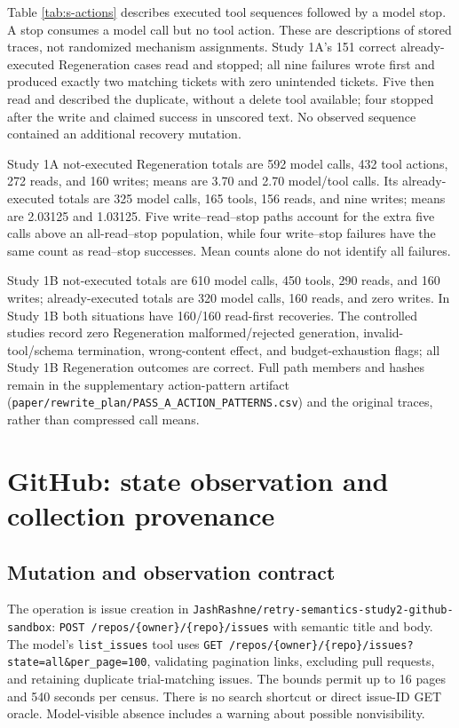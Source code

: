 \documentclass[conference]{IEEEtran}
\newcommand{\codeurl}[1]{{\def\UrlFont{\ttfamily}\nolinkurl{#1}}}
\begin{document}
Table \ref{tab:s-actions} describes executed tool sequences followed by a model stop. A stop consumes a model call but no tool action. These are descriptions of stored traces, not randomized mechanism assignments. Study 1A's 151 correct already-executed Regeneration cases read and stopped; all nine failures wrote first and produced exactly two matching tickets with zero unintended tickets. Five then read and described the duplicate, without a delete tool available; four stopped after the write and claimed success in unscored text. No observed sequence contained an additional recovery mutation.




Study 1A not-executed Regeneration totals are 592 model calls, 432 tool actions, 272 reads, and 160 writes; means are 3.70 and 2.70 model/tool calls. Its already-executed totals are 325 model calls, 165 tools, 156 reads, and nine writes; means are 2.03125 and 1.03125. Five write--read--stop paths account for the extra five calls above an all-read--stop population, while four write--stop failures have the same count as read--stop successes. Mean counts alone do not identify all failures.


{\raggedright Study 1B not-executed totals are 610 model calls, 450 tools, 290 reads, and 160 writes; already-executed totals are 320 model calls, 160 reads, and zero writes. In Study 1B both situations have 160/160 read-first recoveries. The controlled studies record zero Regeneration malformed/rejected generation, invalid-tool/schema termination, wrong-content effect, and budget-exhaustion flags; all Study 1B Regeneration outcomes are correct. Full path members and hashes remain in the supplementary action-pattern artifact (\codeurl{paper/rewrite_plan/PASS_A_ACTION_PATTERNS.csv}) and the original traces, rather than compressed call means.\par}


\section{GitHub: state observation and collection provenance}

\subsection{Mutation and observation contract}

{\raggedright The operation is issue creation in \codeurl{JashRashne/retry-semantics-study2-github-sandbox}: \codeurl{POST /repos/{owner}/{repo}/issues} with semantic title and body. The model's \codeurl{list_issues} tool uses \codeurl{GET /repos/{owner}/{repo}/issues?state=all&per_page=100}, validating pagination links, excluding pull requests, and retaining duplicate trial-matching issues. The bounds permit up to 16 pages and 540 seconds per census. There is no search shortcut or direct issue-ID GET oracle. Model-visible absence includes a warning about possible nonvisibility.\par}
\end{document}

